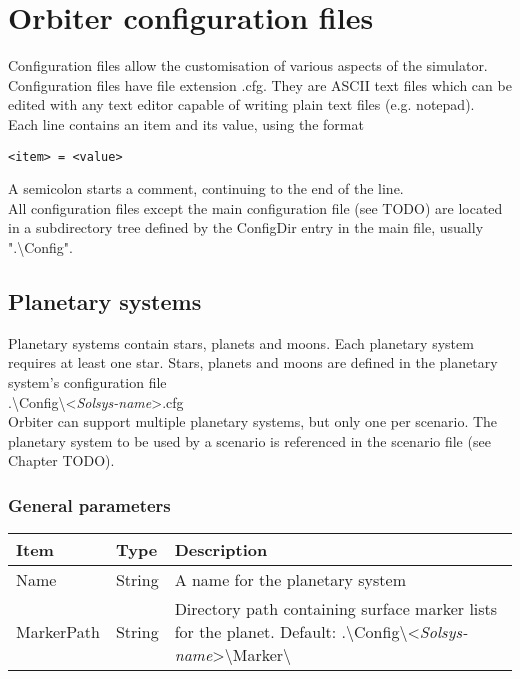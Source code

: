 \documentclass[Orbiter Developer Manual.tex]{subfiles}
\begin{document}
\section{Orbiter configuration files}
Configuration files allow the customisation of various aspects of the simulator. Configuration files have file extension .cfg. They are ASCII text files which can be edited with any text editor capable of writing plain text files (e.g. notepad).\\
Each line contains an item and its value, using the format

\begin{lstlisting}[language=OSFS]
<item> = <value>
\end{lstlisting}

\noindent
A semicolon starts a comment, continuing to the end of the line.\\
All configuration files except the main configuration file (see TODO) are located in a subdirectory tree defined by the ConfigDir entry in the main file, usually ".\textbackslash Config".

\subsection{Planetary systems}
Planetary systems contain stars, planets and moons. Each planetary system requires at least one star. Stars, planets and moons are defined in the planetary system’s configuration file\\
\indent .\textbackslash Config\textbackslash <\textit{Solsys-name}>.cfg\\
Orbiter can support multiple planetary systems, but only one per scenario. The planetary system to be used by a scenario is referenced in the scenario file (see Chapter TODO).

\subsubsection*{General parameters}

	\begin{longtable}{ |p{}|p{}|p{}| }
	\hline\rule{0pt}{2ex}
	\textbf{Item} & \textbf{Type} & \textbf{Description}\\
	\hline\rule{0pt}{2ex}
	Name & String & A name for the planetary system\\
	\hline\rule{0pt}{2ex}
	MarkerPath & String & Directory path containing surface marker lists for the planet. Default: .\textbackslash Config\textbackslash <\textit{Solsys-name}>\textbackslash Marker\textbackslash \\
	\hline
	\end{longtable}
\end{document}
